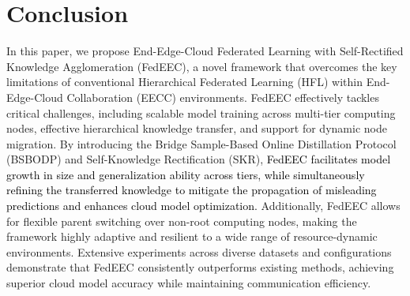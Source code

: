 \documentclass[10pt,journal]{IEEEtran}
\begin{document}
\section{Conclusion}
In this paper, we propose End-Edge-Cloud Federated Learning with Self-Rectified Knowledge Agglomeration (FedEEC), a novel framework that overcomes the key limitations of conventional Hierarchical Federated Learning (HFL) within End-Edge-Cloud Collaboration (EECC) environments. FedEEC effectively tackles critical challenges, including scalable model training across multi-tier computing nodes, effective hierarchical knowledge transfer, and support for dynamic node migration. By introducing the Bridge Sample-Based Online Distillation Protocol (BSBODP) and Self-Knowledge Rectification (SKR), \textcolor{black}{FedEEC facilitates model growth in size and generalization ability across tiers, while simultaneously refining the transferred knowledge to mitigate the propagation of misleading predictions and enhances cloud model optimization.} Additionally, FedEEC allows for flexible parent switching over non-root computing nodes, making the framework highly adaptive and resilient to a wide range of resource-dynamic environments. Extensive experiments across diverse datasets and configurations demonstrate that FedEEC consistently outperforms existing methods, achieving superior cloud model accuracy while maintaining communication efficiency.



\color{black}
\ifCLASSOPTIONcaptionsoff
  \newpage
\fi
\end{document}
